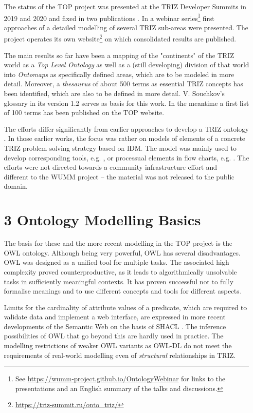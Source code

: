 \documentclass[12pt,a4paper]{article}
\begin{document}
The status of the TOP project was presented at the TRIZ Developer Summits in
2019 and 2020 and fixed in two publications \cite{11,12}. In a webinar
series\footnote{See \url{https://wumm-project.github.io/OntologyWebinar} for
  links to the presentations and an English summary of the talks and
  discussions.} first approaches of a detailed modelling of several TRIZ
sub-areas were presented. The project operates its own
website\footnote{\url{https://triz-summit.ru/onto_triz/}} on which
consolidated results are published.

The main results so far have been a mapping of the "continents" of the TRIZ
world as a \emph{Top Level Ontology} as well as a (still developing) division
of that world into \emph{Ontomaps} as specifically defined areas, which are to
be modeled in more detail. Moreover, a \emph{thesaurus} of about 500 terms as
essential TRIZ concepts has been identified, which are also to be defined in
more detail. V. Souchkov’s glossary in its version 1.2 \cite{21} serves as
basis for this work. In the meantime a first list of 100 terms \cite{23} has
been published on the TOP website.

The efforts differ significantly from earlier approaches to develop a TRIZ
ontology \cite{3, 4, 5, 6, 31, 32}. In those earlier works, the focus was
rather on models of elements of a concrete TRIZ problem solving strategy based
on IDM. The model was mainly used to develop corresponding tools, e.g.
\cite{5}, or processual elements in flow charts, e.g. \cite{4}. The efforts
were not directed towards a community infrastructure effort and – different to
the WUMM project – the material was not released to the public domain.

\section*{3 Ontology Modelling Basics}

The basis for these and the more recent modelling in the TOP project is the
OWL ontology. Although being very powerful, OWL has several disadvantages. OWL
was designed as a unified tool for multiple tasks. The associated high
complexity proved counterproductive, as it leads to algorithmically unsolvable
tasks in sufficiently meaningful contexts. It has proven successful not to
fully formalise meanings and to use different concepts and tools for different
aspects.

Limits for the cardinality of attribute values of a predicate, which are
required to validate data and implement a web interface, are expressed in more
recent developments of the Semantic Web on the basis of SHACL \cite{18}. The
inference possibilities of OWL that go beyond this are hardly used in
practice. The modelling restrictions of weaker OWL variants as OWL-DL do not
meet the requirements of real-world modelling even of \emph{structural}
relationships in TRIZ.
\end{document}

